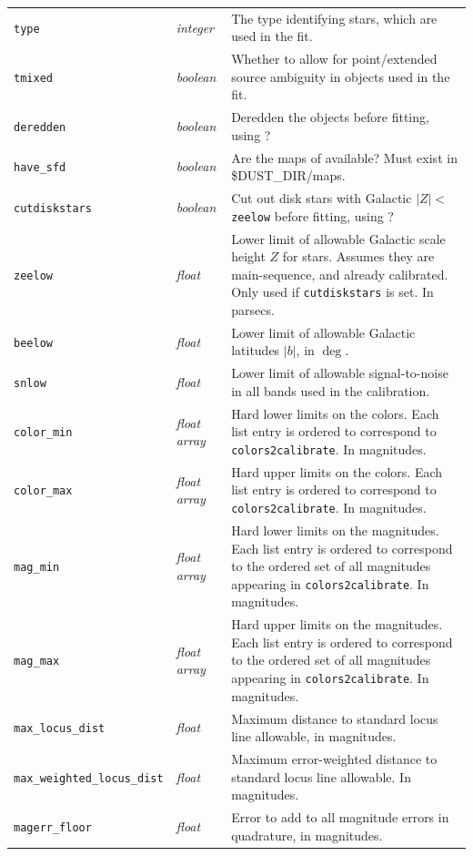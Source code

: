 \documentclass{report}
\begin{document}
\begin{center}
\begin{longtable}{llp{2in}}
\verb|type| & {\it integer} & The type identifying stars, which are used in the fit. \\
\verb|tmixed| & {\it boolean} & Whether to allow for point/extended source ambiguity in objects used in the fit. \\
\verb|deredden| & {\it boolean} & Deredden the objects before fitting, using \citet{bib:sfd}? \\
\verb|have_sfd| & {\it boolean} & Are the maps of \citet{bib:sfd} available? Must exist in \$DUST\_DIR/maps. \\
\verb|cutdiskstars| & {\it boolean} & Cut out disk stars with Galactic $|Z|<$ \verb|zeelow| before fitting, using \citet{bib:juric}?  \\
\verb|zeelow| & {\it float} & Lower limit of allowable Galactic scale height $Z$ for stars. Assumes they are main-sequence, and already calibrated. Only used if \verb|cutdiskstars| is set. In parsecs. \\
\verb|beelow| & {\it float} & Lower limit of allowable Galactic latitudes $|b|$, in $\deg$. \\
\verb|snlow| & {\it float} & Lower limit of allowable signal-to-noise in all bands used in the calibration. \\
\verb|color_min| & {\it float array} & Hard lower limits on the colors. Each list entry is ordered to correspond to \verb|colors2calibrate|. In magnitudes.  \\
\verb|color_max| & {\it float array} & Hard upper limits on the colors. Each list entry is ordered to correspond to \verb|colors2calibrate|.  In magnitudes. \\
\verb|mag_min| & {\it float array} & Hard lower limits on the magnitudes. Each list entry is ordered to correspond to the ordered set of all magnitudes appearing in \verb|colors2calibrate|. In magnitudes.  \\
\verb|mag_max| & {\it float array} & Hard upper limits on the magnitudes. Each list entry is ordered to correspond to the ordered set of all magnitudes appearing in \verb|colors2calibrate|.  In magnitudes. \\
\verb|max_locus_dist| & {\it float} & Maximum distance to standard locus line allowable, in magnitudes.  \\
\verb|max_weighted_locus_dist| & {\it float} & Maximum error-weighted distance to standard locus line allowable. In magnitudes.  \\
\verb|magerr_floor| & {\it float} & Error to add to all magnitude errors in quadrature, in magnitudes.  \\

\end{longtable}
\end{center}
\end{document}

